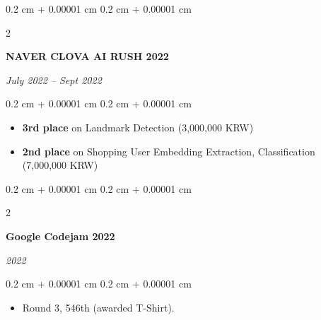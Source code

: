 \documentclass[10pt, letterpaper]{article}
\newenvironment{highlights}{
    \begin{itemize}[
        topsep=0.10 cm,
        parsep=0.10 cm,
        partopsep=0pt,
        itemsep=0pt,
        leftmargin=0.4 cm + 10pt
    ]
}{
    \end{itemize}
} %
\newenvironment{onecolentry}{
    \begin{adjustwidth}{
        0.2 cm + 0.00001 cm
    }{
        0.2 cm + 0.00001 cm
    }
}{
    \end{adjustwidth}
} %
\newenvironment{twocolentry}[2][]{
    \onecolentry
    \def\secondColumn{#2}
    \setcolumnwidth{\fill, 4.5 cm}
    \begin{paracol}{2}
}{
    \switchcolumn \raggedleft \secondColumn
    \end{paracol}
    \endonecolentry
} %
\let\hrefWithoutArrow\href
\renewcommand{\href}[2]{\hrefWithoutArrow{#1}{\ifthenelse{\equal{#2}{}}{ }{#2 }\raisebox{.15ex}{\footnotesize \faExternalLink*}}}
\begin{document}
\vspace{0.2 cm}

\begin{twocolentry}{
        \textit{July 2022 – Sept 2022}
    }
    \textbf{NAVER CLOVA AI RUSH 2022 \href{https://campaign.naver.com/clova_airush/}{[link]}}
\end{twocolentry}

\vspace{0.10 cm}
\begin{onecolentry}
    \begin{highlights}
        \item \textbf{3rd place} on Landmark Detection (3,000,000 KRW)
        \item \textbf{2nd place} on Shopping User Embedding Extraction, Classification (7,000,000 KRW)
    \end{highlights}
\end{onecolentry}

\vspace{0.2 cm}

\begin{twocolentry}{
        \textit{2022}
    }
    \textbf{Google Codejam 2022}
\end{twocolentry}

\vspace{0.10 cm}
\begin{onecolentry}
    \begin{highlights}
        \item Round 3, 546th (awarded T-Shirt).
    \end{highlights}
\end{onecolentry}
\end{document}
